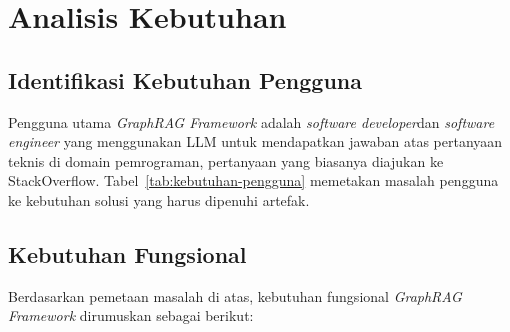 \section{Analisis Kebutuhan}
\label{sec:analisis-kebutuhan}

\subsection{Identifikasi Kebutuhan Pengguna}
\label{subsec:identifikasi-kebutuhan-pengguna}

Pengguna utama \emph{GraphRAG Framework} adalah \emph{software developer}dan \emph{software engineer} yang menggunakan LLM untuk mendapatkan jawaban atas pertanyaan teknis di domain pemrograman, pertanyaan yang biasanya diajukan
ke StackOverflow. Tabel~\ref{tab:kebutuhan-pengguna} memetakan masalah pengguna ke kebutuhan solusi yang harus dipenuhi artefak.


\subsection{Kebutuhan Fungsional}
\label{subsec:kebutuhan-fungsional}

Berdasarkan pemetaan masalah di atas, kebutuhan fungsional \emph{GraphRAG Framework} dirumuskan sebagai berikut:

